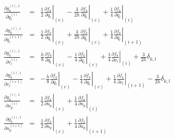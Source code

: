 \documentclass[a4paper]{article}
\begin{document}
\begin{eqnarray}
\frac{\partial g_k^{(i),1}}{\partial q_l^{(i)}}
&=& \frac{1}{2} \left. \frac{\partial f_k}{\partial q_l} \right|_{(c)}
 - \frac{3}{2h} \left. \frac{\partial f_k}{\partial \dot{q}_l} \right|_{(c)}
 + \frac{1}{4} \left. \frac{\partial f_k}{\partial q_l} \right|_{(i)}\\
\frac{\partial g_k^{(i),1}}{\partial q_l^{(i+1)}}
&=& \frac{1}{2} \left. \frac{\partial f_k}{\partial q_l} \right|_{(c)}
 + \frac{3}{2h} \left. \frac{\partial f_k}{\partial \dot{q}_l} \right|_{(c)}
 + \frac{1}{4} \left. \frac{\partial f_k}{\partial q_l} \right|_{(i+1)}\\
\frac{\partial g_k^{(i),1}}{\partial v_l^{(i)}}
&=& \frac{h}{8} \left. \frac{\partial f_k}{\partial q_l} \right|_{(c)}
 - \frac{1}{4} \left. \frac{\partial f_k}{\partial \dot{q}_l} \right|_{(c)}
 + \frac{1}{4} \left. \frac{\partial f_k}{\partial v_l} \right|_{(i)}
 + \frac{3}{2h} \delta_{k,l}\\
\frac{\partial g_k^{(i),1}}{\partial v_l^{(i+1)}}
&=& - \frac{h}{8} \left. \frac{\partial f_k}{\partial q_l} \right|_{(c)}
 - \frac{1}{4} \left. \frac{\partial f_k}{\partial \dot{q}_l} \right|_{(c)}
 + \frac{1}{4} \left. \frac{\partial f_k}{\partial v_l} \right|_{(i+1)}
 - \frac{3}{2h} \delta_{k,l}\\
\frac{\partial g_k^{(i),1}}{\partial u_p^{(i)}}
&=& \frac{1}{2} \left. \frac{\partial f_k}{\partial u_p} \right|_{(c)}
 + \frac{1}{4} \left. \frac{\partial f_k}{\partial u_p} \right|_{(i)}\\
\frac{\partial g_k^{(i),1}}{\partial u_p^{(i+1)}}
&=& \frac{1}{2} \left. \frac{\partial f_k}{\partial u_p} \right|_{(c)}
 + \frac{1}{4} \left. \frac{\partial f_k}{\partial u_p}\right|_{(i+1)}
\end{eqnarray}
\end{document}
